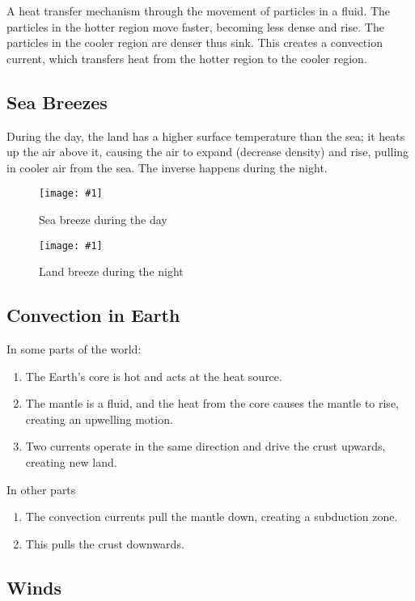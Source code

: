 \documentclass[a4paper,12pt]{article}
\newcommand{\img}[4]{\begin{center}
  \begin{figure}[H]
    \centering
    \texttt{[image: \#1]}
    \caption{#3}
    \label{fig:#4}
  \end{figure}
\end{center}}
\begin{document}
A heat transfer mechanism through the movement of particles in a fluid. The particles in the hotter region move faster, becoming less dense and rise. The particles in the cooler region are denser thus sink. This creates a convection current, which transfers heat from the hotter region to the cooler region.

\subsection{Sea Breezes}

During the day, the land has a higher surface temperature than the sea; it heats up the air above it, causing the air to expand (decrease density) and rise, pulling in cooler air from the sea. The inverse happens during the night.

\begin{minipage}{0.5\textwidth}
  \img{day.png}{1.0}{Sea breeze during the day}{day}
\end{minipage}%
\begin{minipage}{0.5\textwidth}
  \img{night.png}{1.0}{Land breeze during the night}{night}
\end{minipage}%

\pagebreak

\subsection{Convection in Earth}

In some parts of the world:
\begin{enumerate}
  \item The Earth's core is hot and acts at the heat source.
  \item The mantle is a fluid, and the heat from the core causes the mantle to rise, creating an upwelling motion.
  \item Two currents operate in the same direction and drive the crust upwards, creating new land.
\end{enumerate}

In other parts
\begin{enumerate}
  \item The convection currents pull the mantle down, creating a subduction zone.
  \item This pulls the crust downwards.
\end{enumerate}

\subsection{Winds}
\end{document}
